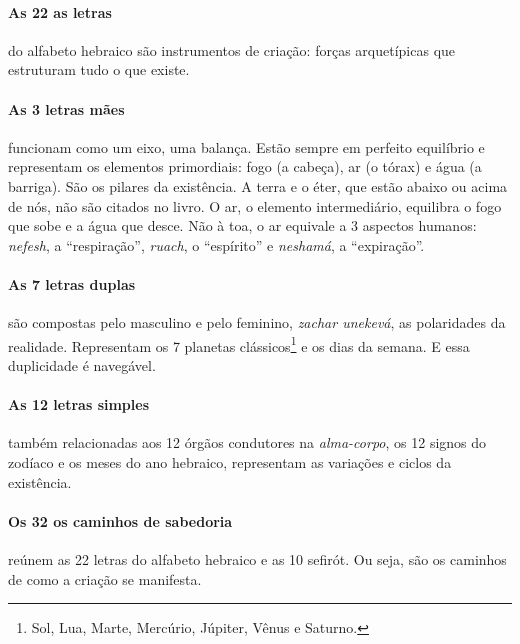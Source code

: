\paragraph{As 22 as letras} do alfabeto hebraico são instrumentos de criação: forças arquetípicas que estruturam tudo o que existe.

\paragraph{As 3 letras mães} funcionam como um eixo, uma balança. Estão sempre em perfeito equilíbrio e representam os elementos primordiais: fogo (a cabeça), ar (o tórax) e água (a barriga). São os pilares da existência. A terra e o éter, que estão abaixo ou acima de nós, não são citados no livro. O ar, o elemento intermediário, equilibra o fogo que sobe e a água que desce. Não à toa, o ar equivale a 3 aspectos humanos: \textit{nefesh}, a ``respiração'', \textit{ruach}, o ``espírito'' e \textit{neshamá}, a ``expiração''. 

\paragraph{As 7 letras duplas} são compostas pelo masculino e pelo feminino, \textit{zachar unekevá}, as polaridades da realidade. Representam os 7 planetas clássicos\footnote{Sol, Lua, Marte, Mercúrio, Júpiter, Vênus e Saturno.} e os dias da semana. E essa duplicidade é navegável. 

\paragraph{As 12 letras simples} também relacionadas aos 12 órgãos condutores na \textit{alma-corpo}, os 12 signos do zodíaco e os meses do ano hebraico, representam as variações e ciclos da existência. 

\paragraph{Os 32 os caminhos de sabedoria} reúnem as 22 letras do alfabeto hebraico e as 10 sefirót. Ou seja, são os caminhos de como a criação se manifesta.

